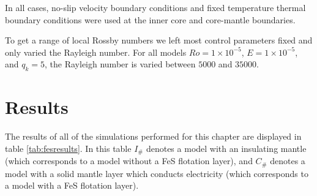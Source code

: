 In all cases, no-slip velocity boundary conditions and fixed temperature thermal boundary conditions were used at the inner core and core-mantle boundaries.

To get a range of local Rossby numbers we left most control parameters fixed and only varied the Rayleigh number. For all models $Ro=1\times10^{-5}$, $E=1\times10^{-5}$, and $q_k=5$, the Rayleigh number is varied between $5000$ and $35000$.

\section{Results}
The results of all of the simulations performed for this chapter are displayed in table \ref{tab:fesresults}. In this table $I_{\#}$ denotes a model with an insulating mantle (which corresponds to a model without a FeS flotation layer), and $C_{\#}$ denotes a model with a solid mantle layer which conducts electricity (which corresponds to a model with a FeS flotation layer). 

